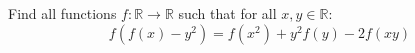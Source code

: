 Find all functions $f\colon\mathbb{R} \rightarrow \mathbb{R}$ such that for all $x,y \in \mathbb{R}$:
$$f(f(x)-y^2)= f(x^2) +y^2f(y) -2f(xy)$$